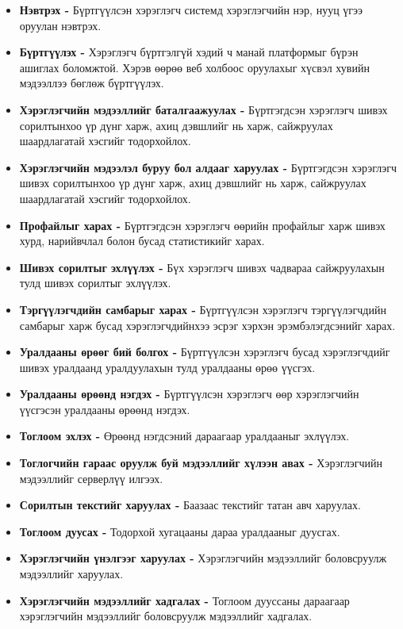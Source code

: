 \begin{itemize}
	\item \textbf{Нэвтрэх -} Бүртгүүлсэн хэрэглэгч системд хэрэглэгчийн нэр, нууц үгээ оруулан нэвтрэх.
	\item \textbf{Бүртгүүлэх -} Хэрэглэгч бүртгэлгүй хэдий ч манай платформыг бүрэн ашиглах боломжтой. Хэрэв өөрөө веб холбоос оруулахыг хүсвэл хувийн мэдээллээ бөглөж бүртгүүлэх.
	\item \textbf{Хэрэглэгчийн мэдээллийг баталгаажуулах -} Бүртгэгдсэн хэрэглэгч шивэх сорилтынхоо үр дүнг харж, ахиц дэвшлийг нь харж, сайжруулах шаардлагатай хэсгийг тодорхойлох.
	\item \textbf{Хэрэглэгчийн мэдээлэл буруу бол алдааг харуулах -} Бүртгэгдсэн хэрэглэгч шивэх сорилтынхоо үр дүнг харж, ахиц дэвшлийг нь харж, сайжруулах шаардлагатай хэсгийг тодорхойлох.
	\item \textbf{Профайлыг харах -} Бүртгэгдсэн хэрэглэгч өөрийн профайлыг харж шивэх хурд, нарийвчлал болон бусад статистикийг харах.
	\item \textbf{Шивэх сорилтыг эхлүүлэх -} Бүх хэрэглэгч шивэх чадвараа сайжруулахын тулд шивэх сорилтыг эхлүүлэх.
	\item \textbf{Тэргүүлэгчдийн самбарыг харах -} Бүртгүүлсэн хэрэглэгч тэргүүлэгчдийн самбарыг харж бусад хэрэглэгчдийнхээ эсрэг хэрхэн эрэмбэлэгдсэнийг харах.
	\item \textbf{Уралдааны өрөөг бий болгох -} Бүртгүүлсэн хэрэглэгч бусад хэрэглэгчдийг шивэх уралдаанд уралдуулахын тулд уралдааны өрөө үүсгэх.
	\item \textbf{Уралдааны өрөөнд нэгдэх -} Бүртгүүлсэн хэрэглэгч өөр хэрэглэгчийн үүсгэсэн уралдааны өрөөнд нэгдэх.
	\item \textbf{Тоглоом эхлэх -} Өрөөнд нэгдсэний дараагаар уралдааныг эхлүүлэх.
	\item \textbf{Тоглогчийн гараас оруулж буй мэдээллийг хүлээн авах -} Хэрэглэгчийн мэдээллийг серверлүү илгээх.
	\item \textbf{Сорилтын текстийг харуулах -} Баазаас текстийг татан авч харуулах.
	\item \textbf{Тоглоом дуусах -} Тодорхой хугацааны дараа уралдааныг дуусгах.
	\item \textbf{Хэрэглэгчийн  үнэлгээг харуулах -} Хэрэглэгчийн мэдээллийг боловсруулж мэдээллийг харуулах.
	\item \textbf{Хэрэглэгчийн мэдээллийг хадгалах -} Тоглоом дууссаны дараагаар хэрэглэгчийн мэдээллийг боловсруулж мэдээллийг хадгалах.
\end{itemize}

